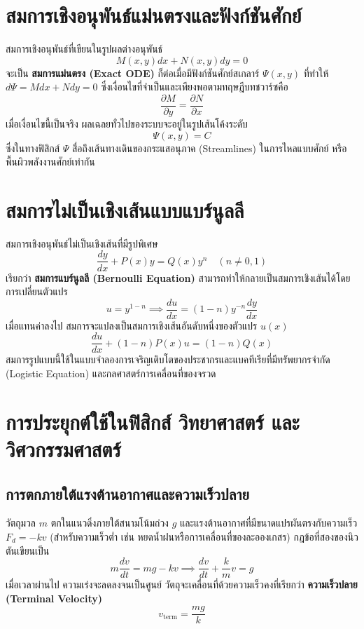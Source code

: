 \section{สมการเชิงอนุพันธ์แม่นตรงและฟังก์ชันศักย์}
สมการเชิงอนุพันธ์ที่เขียนในรูปผลต่างอนุพันธ์
\begin{equation}
M(x, y)dx + N(x, y)dy = 0
\end{equation}
จะเป็น \textbf{สมการแม่นตรง (Exact ODE)} ก็ต่อเมื่อมีฟังก์ชันศักย์สเกลาร์ $\Psi(x, y)$ ที่ทำให้ $d\Psi = M dx + N dy = 0$ ซึ่งเงื่อนไขที่จำเป็นและเพียงพอตามทฤษฎีบทชวาร์ซคือ
\begin{equation}
\frac{\partial M}{\partial y} = \frac{\partial N}{\partial x}
\end{equation}
เมื่อเงื่อนไขนี้เป็นจริง ผลเฉลยทั่วไปของระบบจะอยู่ในรูปเส้นโค้งระดับ
\begin{equation}
\Psi(x, y) = C
\end{equation}
ซึ่งในทางฟิสิกส์ $\Psi$ สื่อถึงเส้นทางเดินของกระแสอนุภาค (Streamlines) ในการไหลแบบศักย์ หรือพื้นผิวพลังงานศักย์เท่ากัน

\section{สมการไม่เป็นเชิงเส้นแบบแบร์นูลลี}
สมการเชิงอนุพันธ์ไม่เป็นเชิงเส้นที่มีรูปพิเศษ
\begin{equation}
\frac{dy}{dx} + P(x)y = Q(x)y^n \quad (n \neq 0, 1)
\end{equation}
เรียกว่า \textbf{สมการแบร์นูลลี (Bernoulli Equation)} สามารถทำให้กลายเป็นสมการเชิงเส้นได้โดยการเปลี่ยนตัวแปร
\begin{equation}
u = y^{1-n} \implies \frac{du}{dx} = (1-n)y^{-n}\frac{dy}{dx}
\end{equation}
เมื่อแทนค่าลงไป สมการจะแปลงเป็นสมการเชิงเส้นอันดับหนึ่งของตัวแปร $u(x)$
\begin{equation}
\frac{du}{dx} + (1-n)P(x)u = (1-n)Q(x)
\end{equation}
สมการรูปแบบนี้ใช้ในแบบจำลองการเจริญเติบโตของประชากรและแบคทีเรียที่มีทรัพยากรจำกัด (Logistic Equation) และกลศาสตร์การเคลื่อนที่ของจรวด

\section{การประยุกต์ใช้ในฟิสิกส์ วิทยาศาสตร์ และวิศวกรรมศาสตร์}
\subsection{การตกภายใต้แรงต้านอากาศและความเร็วปลาย}
วัตถุมวล $m$ ตกในแนวดิ่งภายใต้สนามโน้มถ่วง $g$ และแรงต้านอากาศที่มีขนาดแปรผันตรงกับความเร็ว $F_d = -kv$ (สำหรับความเร็วต่ำ เช่น หยดน้ำฝนหรือการเคลื่อนที่ของละอองเกสร) กฎข้อที่สองของนิวตันเขียนเป็น
\begin{equation}
m\frac{dv}{dt} = mg - kv \implies \frac{dv}{dt} + \frac{k}{m}v = g
\end{equation}
เมื่อเวลาผ่านไป ความเร่งจะลดลงจนเป็นศูนย์ วัตถุจะเคลื่อนที่ด้วยความเร็วคงที่เรียกว่า \textbf{ความเร็วปลาย (Terminal Velocity)}
\begin{equation}
v_{\text{term}} = \frac{mg}{k}
\end{equation}

